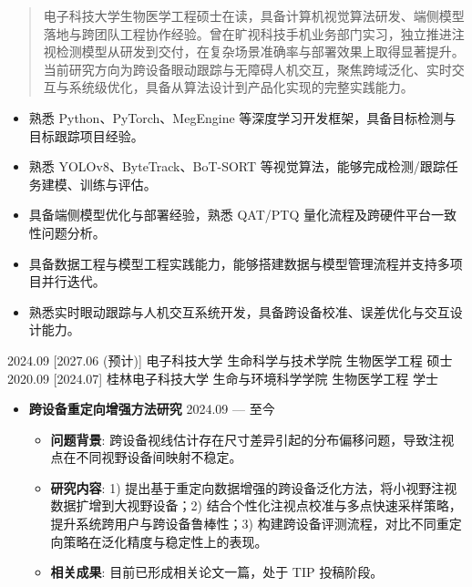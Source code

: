 \documentclass[zh]{resume}
\begin{document}
\makeheader

\begin{abstract}
电子科技大学生物医学工程硕士在读，具备计算机视觉算法研发、端侧模型落地与跨团队工程协作经验。曾在旷视科技手机业务部门实习，独立推进注视检测模型从研发到交付，在复杂场景准确率与部署效果上取得显著提升。当前研究方向为跨设备眼动跟踪与无障碍人机交互，聚焦跨域泛化、实时交互与系统级优化，具备从算法设计到产品化实现的完整实践能力。
\end{abstract}

\begin{itemize}
  \item 熟悉 Python、PyTorch、MegEngine 等深度学习开发框架，具备目标检测与目标跟踪项目经验。
  \item 熟悉 YOLOv8、ByteTrack、BoT-SORT 等视觉算法，能够完成检测/跟踪任务建模、训练与评估。
  \item 具备端侧模型优化与部署经验，熟悉 QAT/PTQ 量化流程及跨硬件平台一致性问题分析。
  \item 具备数据工程与模型工程实践能力，能够搭建数据与模型管理流程并支持多项目并行迭代。
  \item 熟悉实时眼动跟踪与人机交互系统开发，具备跨设备校准、误差优化与交互设计能力。
\end{itemize}

\begin{educations}
  \education%
    {2024.09}%
    [2027.06 (预计)]%
    {电子科技大学}%
    {生命科学与技术学院}%
    {生物医学工程}%
    {硕士}
  \separator{0.5ex}
  \education%
    {2020.09}%
    [2024.07]%
    {桂林电子科技大学}%
    {生命与环境科学学院}%
    {生物医学工程}%
    {学士}
\end{educations}

\begin{itemize}
  \item \textbf{跨设备重定向增强方法研究} \hfill 2024.09 --- 至今
    \begin{itemize}
    \item \textbf{问题背景}: 跨设备视线估计存在尺寸差异引起的分布偏移问题，导致注视点在不同视野设备间映射不稳定。
    \item \textbf{研究内容}: 1) 提出基于重定向数据增强的跨设备泛化方法，将小视野注视数据扩增到大视野设备；2) 结合个性化注视点校准与多点快速采样策略，提升系统跨用户与跨设备鲁棒性；3) 构建跨设备评测流程，对比不同重定向策略在泛化精度与稳定性上的表现。
    \item \textbf{相关成果}: 目前已形成相关论文一篇，处于 TIP 投稿阶段。
    \end{itemize}
\end{itemize}
\end{document}
